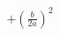 \documentclass[preview]{standalone}
\begin{document}
\begin{align*}
+\left(\frac{b}{2a}\right)^2
\end{align*}
\end{document}
